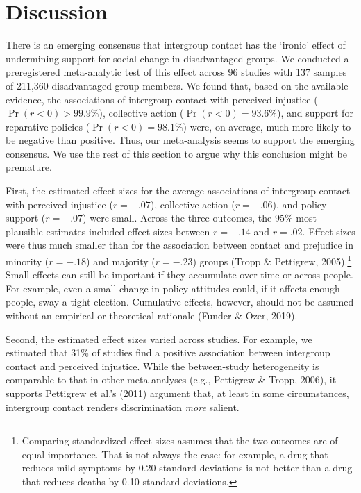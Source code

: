 \documentclass[twocolumn, 11pt, letterpaper]{article}
\begin{document}
\hypertarget{discussion}{%
\section{Discussion}\label{discussion}}

There is an emerging consensus that intergroup contact has the `ironic'
effect of undermining support for social change in disadvantaged groups.
We conducted a preregistered meta-analytic test of this effect across 96
studies with 137 samples of 211,360 disadvantaged-group members. We
found that, based on the available evidence, the associations of
intergroup contact with perceived injustice (\(\Pr (r < 0) > 99.9\%\)),
collective action (\(\Pr (r < 0) = 93.6\%\)), and support for reparative
policies (\(\Pr (r < 0) = 98.1\%\)) were, on average, much more likely
to be negative than positive. Thus, our meta-analysis seems to support
the emerging consensus. We use the rest of this section to argue why
this conclusion might be premature.

First, the estimated effect sizes for the average associations of
intergroup contact with perceived injustice (\(r = -.07\)), collective
action (\(r = -.06\)), and policy support (\(r = -.07\)) were small.
Across the three outcomes, the 95\% most plausible estimates included
effect sizes between \(r = -.14\) and \(r = .02\). Effect sizes were
thus much smaller than for the association between contact and prejudice
in minority (\(r = -.18\)) and majority (\(r = -.23\)) groups (Tropp \&
Pettigrew, 2005).\footnote{Comparing standardized effect sizes assumes
  that the two outcomes are of equal importance. That is not always the
  case: for example, a drug that reduces mild symptoms by 0.20 standard
  deviations is not better than a drug that reduces deaths by 0.10
  standard deviations.} Small effects can still be important if they
accumulate over time or across people. For example, even a small change
in policy attitudes could, if it affects enough people, sway a tight
election. Cumulative effects, however, should not be assumed without an
empirical or theoretical rationale (Funder \& Ozer, 2019).

Second, the estimated effect sizes varied across studies. For example,
we estimated that 31\% of studies find a positive association between
intergroup contact and perceived injustice. While the between-study
heterogeneity is comparable to that in other meta-analyses (e.g.,
Pettigrew \& Tropp, 2006), it supports Pettigrew et al.'s (2011)
argument that, at least in some circumstances, intergroup contact
renders discrimination \emph{more} salient.
\end{document}
